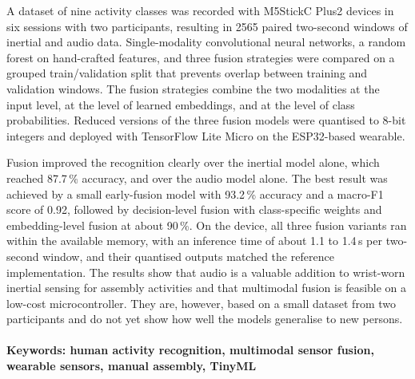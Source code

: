\documentclass[a4paper, 12pt, oneside, BCOR1cm,toc=chapterentrywithdots]{scrbook}
\renewcommand*{\tableofcontents}{%
  	\begingroup
  	\tocsection
  	\tocfile{\contentsname}{toc}
  	\endgroup
}
\renewcommand*{\listoffigures}{%
  	\begingroup
  	\tocsection
  	\tocfile{\listfigurename}{lof}
  	\endgroup
}
\renewcommand{\listoftables}{
	\begingroup
	\tocsection
	\tocfile{\listtablename}{lot}
	\endgroup
}
\begin{document}
A dataset of nine activity classes was recorded with M5StickC Plus2 devices in
six sessions with two participants, resulting in 2565 paired two-second windows
of inertial and audio data. Single-modality convolutional neural networks, a
random forest on hand-crafted features, and three fusion strategies were
compared on a grouped train/validation split that prevents overlap between
training and validation windows. The fusion strategies combine the two
modalities at the input level, at the level of learned embeddings, and at the
level of class probabilities. Reduced versions of the three fusion models were
quantised to 8-bit integers and deployed with TensorFlow Lite Micro on the
ESP32-based wearable.

Fusion improved the recognition clearly over the inertial model alone, which
reached 87.7\,\% accuracy, and over the audio model alone. The best result was
achieved by a small early-fusion model with 93.2\,\% accuracy and a macro-F1
score of 0.92, followed by decision-level fusion with class-specific weights
and embedding-level fusion at about 90\,\%. On the device, all three fusion
variants ran within the available memory, with an inference time of about 1.1
to 1.4\,s per two-second window, and their quantised outputs matched the
reference implementation. The results show that audio is a valuable addition
to wrist-worn inertial sensing for assembly activities and that multimodal
fusion is feasible on a low-cost microcontroller. They are, however, based on
a small dataset from two participants and do not yet show how well the models
generalise to new persons.
\\\\
\textbf{Keywords: human activity recognition, multimodal sensor fusion,
wearable sensors, manual assembly, TinyML}


\tableofcontents
\listoffigures
\listoftables

\twocolumn
{}
\begin{acronym}[TFLM]
\end{acronym}
\end{document}
